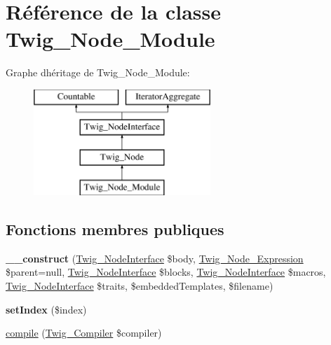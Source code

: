 \hypertarget{class_twig___node___module}{}\section{Référence de la classe Twig\+\_\+\+Node\+\_\+\+Module}
\label{class_twig___node___module}
Graphe d\textquotesingle{}héritage de Twig\+\_\+\+Node\+\_\+\+Module\+:\begin{figure}[H]
\begin{center}
\leavevmode
\includegraphics[height=4.000000cm]{class_twig___node___module}
\end{center}
\end{figure}
\subsection*{Fonctions membres publiques}
\begin{DoxyCompactItemize}
\item 
{\bfseries \+\_\+\+\_\+construct} (\hyperlink{interface_twig___node_interface}{Twig\+\_\+\+Node\+Interface} \$body, \hyperlink{class_twig___node___expression}{Twig\+\_\+\+Node\+\_\+\+Expression} \$parent=null, \hyperlink{interface_twig___node_interface}{Twig\+\_\+\+Node\+Interface} \$blocks, \hyperlink{interface_twig___node_interface}{Twig\+\_\+\+Node\+Interface} \$macros, \hyperlink{interface_twig___node_interface}{Twig\+\_\+\+Node\+Interface} \$traits, \$embedded\+Templates, \$filename)\hypertarget{class_twig___node___module_a12208720e82e5d73ba02162300bf4dd9}{}\label{class_twig___node___module_a12208720e82e5d73ba02162300bf4dd9}

\item 
{\bfseries set\+Index} (\$index)\hypertarget{class_twig___node___module_ae0d7cd73f8a39406c10dfa943609ebc6}{}\label{class_twig___node___module_ae0d7cd73f8a39406c10dfa943609ebc6}

\item 
\hyperlink{class_twig___node___module_a4e0faa87c3fae583620b84d3607085da}{compile} (\hyperlink{class_twig___compiler}{Twig\+\_\+\+Compiler} \$compiler)
\end{DoxyCompactItemize}
